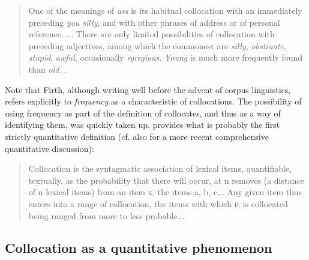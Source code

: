\begin{quotation}
One of the meanings of \textit{ass} is its habitual collocation with an immediately preceding \textit{you silly}, and with other phrases of address or of personal reference. ... There are only limited possibilities of collocation with preceding adjectives,  among which the commonest are \textit{silly}, \textit{obstinate}, \textit{stupid}, \textit{awful}, occasionally \textit{egregious}. \textit{Young} is much more frequently found than \textit{old}. \citep[194f]{firth_papers_1957}.
\end{quotation}

Note that Firth, although writing well before the advent of corpus linguistics, refers explicitly to \textit{frequency} as a characteristic of collocations.  The possibility of using frequency as part of the definition of collocates, and thus as a way of identifying them, was quickly taken up. \citet{halliday_categories_1961} provides what is probably the first strictly quantitative definition (cf. also \citet{church_word_1990} for a more recent comprehensive quantitative  discussion):

\begin{quotation}
Collocation  is the syntagmatic  association  of lexical items, quantifiable,  textually, as the probability  that there will occur, at n removes (a distance of n lexical items) from an item x, the items a, b, c... Any given item thus enters into a range of collocation, the items with which it is collocated being ranged from more to less probable... \citep[276]{halliday_categories_1961}
\end{quotation}

\subsection{Collocation as a quantitative phenomenon}
\label{sec:collocationasaquantitativephenomenon}

